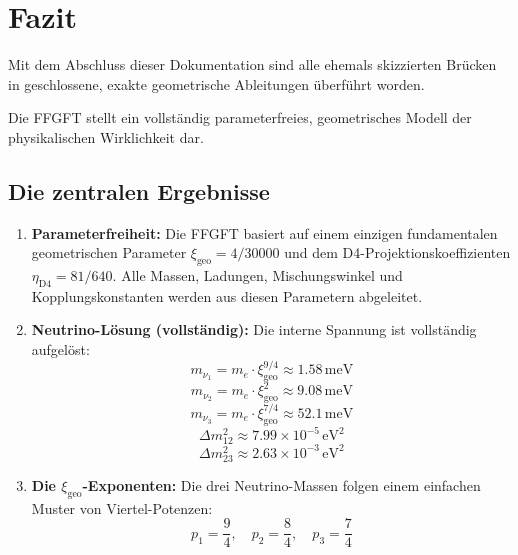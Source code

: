 \documentclass[11pt,a4paper]{article}
\newcommand{\xigeo}{\xi_{\text{geo}}}
\newcommand{\etaDfour}{\eta_{\text{D4}}}
\begin{document}
	\section{Fazit}
	
	Mit dem Abschluss dieser Dokumentation sind alle ehemals skizzierten Brücken in geschlossene, exakte geometrische Ableitungen überführt worden.
	
	Die FFGFT stellt ein vollständig parameterfreies, geometrisches Modell der physikalischen Wirklichkeit dar.
	
	\subsection{Die zentralen Ergebnisse}
	
	\begin{enumerate}
		\item \textbf{Parameterfreiheit:} Die FFGFT basiert auf einem einzigen fundamentalen geometrischen Parameter $\xigeo = 4/30000$ und dem D4-Projektionskoeffizienten $\etaDfour = 81/640$. Alle Massen, Ladungen, Mischungswinkel und Kopplungskonstanten werden aus diesen Parametern abgeleitet.
		
		\item \textbf{Neutrino-Lösung (vollständig):} Die interne Spannung ist vollständig aufgelöst:
		\begin{equation}
			m_{\nu_1} = m_e \cdot \xigeo^{9/4} \approx 1.58\,\text{meV}
		\end{equation}
		\begin{equation}
			m_{\nu_2} = m_e \cdot \xigeo^{2} \approx 9.08\,\text{meV}
		\end{equation}
		\begin{equation}
			m_{\nu_3} = m_e \cdot \xigeo^{7/4} \approx 52.1\,\text{meV}
		\end{equation}
		\begin{equation}
			\Delta m_{12}^2 \approx 7.99 \times 10^{-5}\,\text{eV}^2
		\end{equation}
		\begin{equation}
			\Delta m_{23}^2 \approx 2.63 \times 10^{-3}\,\text{eV}^2
		\end{equation}
		
		\item \textbf{Die $\xigeo$-Exponenten:} Die drei Neutrino-Massen folgen einem einfachen Muster von Viertel-Potenzen:
		\begin{equation}
			p_1 = \frac{9}{4}, \quad p_2 = \frac{8}{4}, \quad p_3 = \frac{7}{4}
		\end{equation}
		

\end{enumerate}
\end{document}
